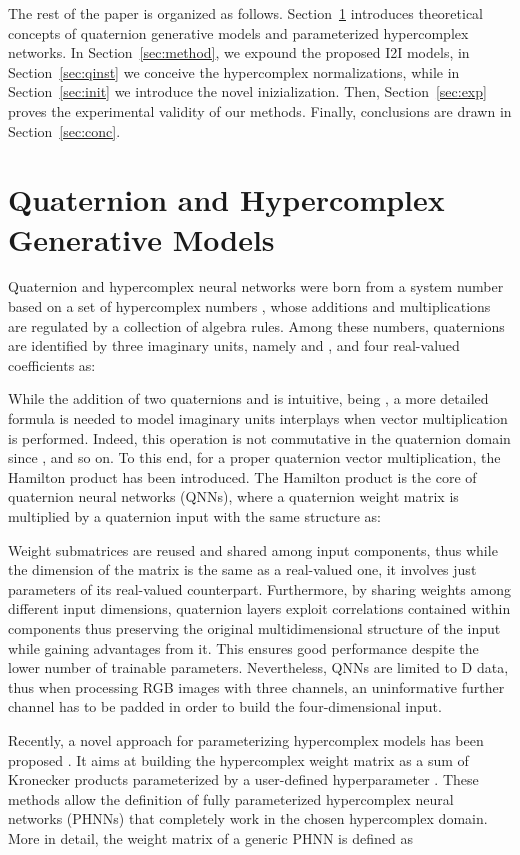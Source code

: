 \documentclass[conference]{IEEEtran}
\begin{document}
The rest of the paper is organized as follows. Section~\ref{sec:qnn} introduces theoretical concepts of quaternion generative models and parameterized hypercomplex networks. In Section~\ref{sec:method}, we expound the proposed I2I models, in Section~\ref{sec:qinst} we conceive the hypercomplex normalizations, while in Section~\ref{sec:init} we introduce the novel inizialization. Then, Section~\ref{sec:exp} proves the experimental validity of our methods. Finally, conclusions are drawn in Section~\ref{sec:conc}.


\section{Quaternion and Hypercomplex Generative Models}
\label{sec:qnn}

Quaternion and hypercomplex neural networks were born from a system number based on a set of hypercomplex numbers , whose additions and multiplications are regulated by a collection of algebra rules. Among these numbers, quaternions are identified by three imaginary units, namely  and , and four real-valued coefficients  as:


While the addition of two quaternions  and  is intuitive, being , a more detailed formula is needed to model imaginary units interplays when vector multiplication is performed. Indeed, this operation is not commutative in the quaternion domain since , and so on. To this end, for a proper quaternion vector multiplication, the Hamilton product has been introduced. The Hamilton product is the core of quaternion neural networks (QNNs), where a quaternion weight matrix  is multiplied by a quaternion input  with the same structure as:



\noindent Weight submatrices are reused and shared among input components, thus while the dimension of the matrix  is the same as a real-valued one, it involves just  parameters of its real-valued counterpart. Furthermore, by sharing weights among different input dimensions, quaternion layers exploit correlations contained within components thus preserving the original multidimensional structure of the input while gaining advantages from it. This ensures good performance despite the lower number of trainable parameters.
Nevertheless, QNNs are limited to D data, thus when processing RGB images with three channels, an uninformative further channel has to be padded in order to build the four-dimensional input.

Recently, a novel approach for parameterizing hypercomplex models has been proposed \cite{Zhang2021PHM, grassucci2021lightweight}. It aims at building the hypercomplex weight matrix as a sum of Kronecker products parameterized by a user-defined hyperparameter . These methods allow the definition of fully parameterized hypercomplex neural networks (PHNNs) that completely work in the chosen hypercomplex domain. More in detail, the weight matrix  of a generic PHNN is defined as
\end{document}
